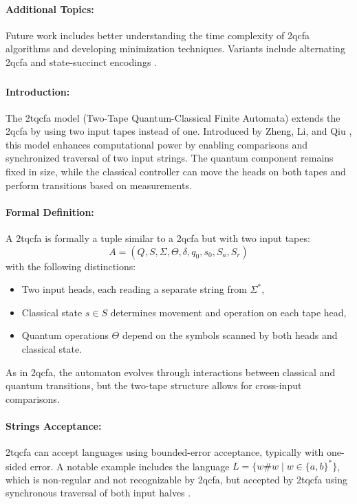 \paragraph{Additional Topics:}  
Future work includes better understanding the time complexity of \gls{2qcfa} algorithms and developing minimization techniques. Variants include alternating \gls{2qcfa} and state-succinct encodings \cite{zheng2013state, remscrim2020lower}.

\subsubsection{}

\paragraph{Introduction:}  
The \gls{2tqcfa} model (Two-Tape Quantum-Classical Finite Automata) extends the \gls{2qcfa} by using two input tapes instead of one. Introduced by Zheng, Li, and Qiu \cite{zheng2011two}, this model enhances computational power by enabling comparisons and synchronized traversal of two input strings. The quantum component remains fixed in size, while the classical controller can move the heads on both tapes and perform transitions based on measurements.

\paragraph{Formal Definition:}  
A \gls{2tqcfa} is formally a tuple similar to a \gls{2qcfa} but with two input tapes:
\[
A = (Q, S, \Sigma, \Theta, \delta, q_0, s_0, S_a, S_r)
\]
with the following distinctions:
\begin{itemize}
    \item Two input heads, each reading a separate string from $\Sigma^*$,
    \item Classical state $s \in S$ determines movement and operation on each tape head,
    \item Quantum operations $\Theta$ depend on the symbols scanned by both heads and classical state.
\end{itemize}
As in \gls{2qcfa}, the automaton evolves through interactions between classical and quantum transitions, but the two-tape structure allows for cross-input comparisons.

\paragraph{Strings Acceptance:}  
\gls{2tqcfa} can accept languages using bounded-error acceptance, typically with one-sided error. A notable example includes the language $L = \{ w \# w \mid w \in \{a, b\}^* \}$, which is non-regular and not recognizable by \gls{2qcfa}, but accepted by \gls{2tqcfa} using synchronous traversal of both input halves \cite{zheng2011two}.

